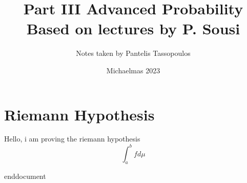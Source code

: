 \documentclass{article}
\title{\Huge Part III Advanced Probability \\ 
\huge Based on lectures by P. Sousi}
\author{\Large Notes taken by Pantelis Tassopoulos}
\date{\Large Michaelmas 2023}
\theoremstyle{mystyle}
\begin{document}
\maketitle
\newpage
\section{Riemann Hypothesis}
Hello, i am proving the riemann hypothesis
\begin{equation}
	\displaystyle \int_{a}^{b} f d\mu
\end{equation}
 
end{document}
\end{document}
